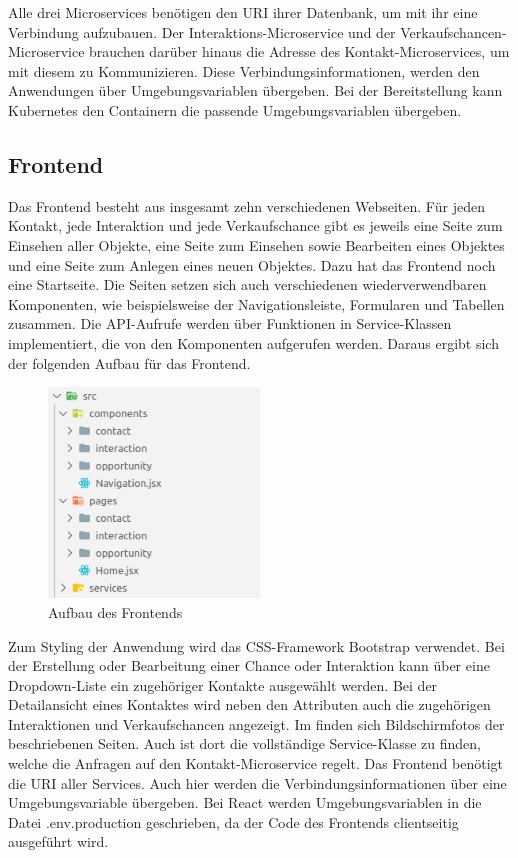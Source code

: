 Alle drei Microservices benötigen den \ac{URI} ihrer Datenbank, um mit ihr eine Verbindung aufzubauen. Der Interaktions-Microservice und der Verkaufschancen-Microservice brauchen darüber hinaus die Adresse des Kontakt-Microservices, um mit diesem zu Kommunizieren. Diese Verbindungsinformationen, werden den Anwendungen über Umgebungsvariablen übergeben. Bei der Bereitstellung kann Kubernetes den Containern die passende Umgebungsvariablen übergeben.

\subsection{Frontend}

Das Frontend besteht aus insgesamt zehn verschiedenen Webseiten. Für jeden Kontakt, jede Interaktion und jede Verkaufschance gibt es jeweils eine Seite zum Einsehen aller Objekte, eine Seite zum Einsehen sowie Bearbeiten eines Objektes und eine Seite zum Anlegen eines neuen Objektes. Dazu hat das Frontend noch eine Startseite. Die Seiten setzen sich auch verschiedenen wiederverwendbaren Komponenten, wie beispielsweise der Navigationsleiste, Formularen und Tabellen zusammen. Die \ac{API}-Aufrufe werden über Funktionen in Service-Klassen implementiert, die von den Komponenten aufgerufen werden. Daraus ergibt sich der folgenden Aufbau für das Frontend.

\begin{figure}[H] 
    \centering
    \includegraphics[width=0.5\textwidth]{figures/AufbauFrontend.png}
    \caption{Aufbau des Frontends}
\end{figure}

Zum Styling der Anwendung wird das CSS-Framework Bootstrap verwendet. Bei der Erstellung oder Bearbeitung einer Chance oder Interaktion kann über eine Dropdown-Liste ein zugehöriger Kontakte ausgewählt werden. Bei der Detailansicht eines Kontaktes wird neben den Attributen auch die zugehörigen Interaktionen und Verkaufschancen angezeigt. Im  finden sich Bildschirmfotos der beschriebenen Seiten. Auch ist dort die vollständige Service-Klasse zu finden, welche die Anfragen auf den Kontakt-Microservice regelt. Das Frontend benötigt die \ac{URI} aller Services. Auch hier werden die Verbindungsinformationen über eine Umgebungsvariable übergeben. Bei React werden Umgebungsvariablen in die Datei .env.production geschrieben, da der Code des Frontends clientseitig ausgeführt wird.

